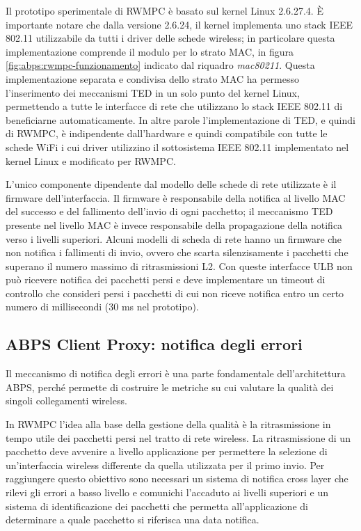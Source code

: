 \documentclass[12pt,a4paper,openright,twoside]{book}
\begin{document}
Il prototipo sperimentale di RWMPC è basato sul kernel Linux
2.6.27.4. È importante notare che dalla versione 2.6.24, il kernel
implementa uno stack IEEE 802.11 utilizzabile da tutti i driver delle
schede wireless; in particolare questa implementazione comprende il
modulo per lo strato MAC, in figura \ref{fig:abps:rwmpc-funzionamento}
indicato dal riquadro \emph{mac80211}. Questa implementazione separata
e condivisa dello strato MAC ha permesso l'inserimento dei meccanismi
TED in un solo punto del kernel Linux, permettendo a tutte le
interfacce di rete che utilizzano lo stack IEEE 802.11 di beneficiarne
automaticamente. In altre parole l'implementazione di TED, e quindi di
RWMPC, è indipendente dall'hardware e quindi compatibile con tutte le
schede WiFi i cui driver utilizzino il sottosistema IEEE 802.11
implementato nel kernel Linux e modificato per RWMPC.

L'unico componente dipendente dal modello delle schede di rete
utilizzate è il firmware dell'interfaccia. Il firmware è responsabile
della notifica al livello MAC del successo e del fallimento dell'invio
di ogni pacchetto; il meccanismo TED presente nel livello MAC è invece
responsabile della propagazione della notifica verso i livelli
superiori. Alcuni modelli di scheda di rete hanno un firmware che non
notifica i fallimenti di invio, ovvero che scarta silenzisamente i
pacchetti che superano il numero massimo di ritrasmissioni L2. Con
queste interfacce ULB non può ricevere notifica dei pacchetti persi e
deve implementare un timeout di controllo che consideri persi i
pacchetti di cui non riceve notifica entro un certo numero di
millisecondi (30 ms nel prototipo).

\subsection{ABPS Client Proxy: notifica degli errori}

Il meccanismo di notifica degli errori è una parte fondamentale
dell'architettura ABPS, perché permette di costruire le metriche su
cui valutare la qualità dei singoli collegamenti wireless.

In RWMPC l'idea alla base della gestione della qualità è la
ritrasmissione in tempo utile dei pacchetti persi nel tratto di rete
wireless. La ritrasmissione di un pacchetto deve avvenire a livello
applicazione per permettere la selezione di un'interfaccia wireless
differente da quella utilizzata per il primo invio. Per raggiungere
questo obiettivo sono necessari un sistema di notifica cross layer che
rilevi gli errori a basso livello e comunichi l'accaduto ai livelli
superiori e un sistema di identificazione dei pacchetti che permetta
all'applicazione di determinare a quale pacchetto si riferisca una
data notifica.
\end{document}
